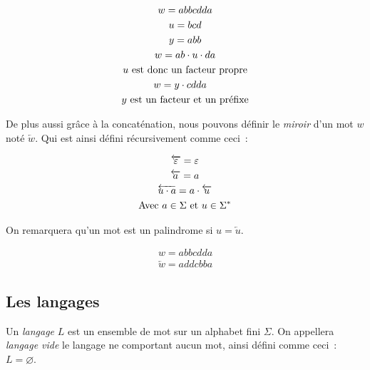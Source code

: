 \begin{example}
    \begin{gather*}
        w = abbcdda \\
        u = bcd \\
        y = abb \\
        w = ab \cdot u \cdot da\\
        u \text{ est donc un facteur propre} \notag \\
        w = y \cdot cdda \quad \\
        y \text{ est un facteur et un préfixe} \notag
    \end{gather*}
\end{example}

\begin{definition}
    De plus aussi grâce à la concaténation, nous pouvons définir le \textit{miroir}
    d'un mot \(w\) noté \(\overleftarrow{w}\). Qui est ainsi défini récursivement
    comme ceci~:

    \begin{gather*}
        \overleftarrow{\varepsilon} = \varepsilon \\
        \overleftarrow{a} = a \\
        \overleftarrow{u \cdot a} = a \cdot \overleftarrow{u} \\
        \text{Avec } a \in \Sigma \text{ et } u \in \Sigma ^ * \notag
    \end{gather*}

    \noindent On remarquera qu'un mot est un palindrome si \(u = \overleftarrow{u}\).
\end{definition}

\begin{example}
    \begin{gather*}
        w = abbcdda \\
        \overleftarrow{w} = addcbba
    \end{gather*}
\end{example}

\subsection{Les langages}

\begin{definition}
    Un \textit{langage} \(L\) est un ensemble de mot sur un alphabet fini
    \(\Sigma\). On appellera \textit{langage vide} le langage ne comportant aucun
    mot, ainsi défini comme ceci~: \(L = \varnothing\).
\end{definition}

